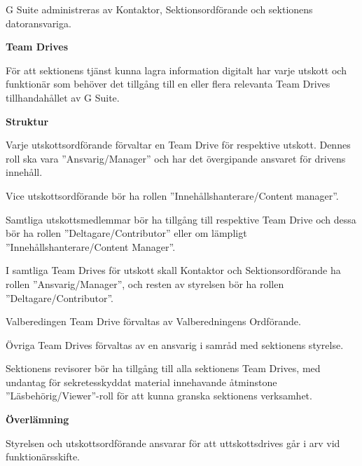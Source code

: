 \documentclass[../_main/handlingar.tex]{subfiles}
\begin{document}
    G Suite administreras av Kontaktor, Sektionsordförande och sektionens datoransvariga. 
    
    \vspace{3px}
    {\large \textbf{Team Drives}}
    \vspace{3px}

    För att sektionens tjänst kunna lagra information digitalt har varje utskott och funktionär som behöver det tillgång till en eller flera relevanta Team Drives tillhandahållet av G Suite. 

    \textbf{Struktur}
    \begin{dashlist}

    \item Varje utskottsordförande förvaltar en Team Drive för respektive utskott. Dennes roll ska vara ''Ansvarig/Manager'' och har det övergipande ansvaret för drivens innehåll. 
    
    \item Vice utskottsordförande bör ha rollen ''Innehållshanterare/Content manager''. 

    \item Samtliga utskottsmedlemmar bör ha tillgång till respektive Team Drive och dessa bör ha rollen ''Deltagare/Contributor'' eller om lämpligt ''Innehållshanterare/Content Manager''. 
    
    \item I samtliga Team Drives för utskott skall Kontaktor och Sektionsordförande ha rollen ''Ansvarig/Manager'', och resten av styrelsen bör ha rollen ''Deltagare/Contributor''.
    
    \item Valberedingen Team Drive förvaltas av Valberedningens Ordförande.
    
    \item Övriga Team Drives förvaltas av en ansvarig i samråd med sektionens styrelse. 

    \item Sektionens revisorer bör ha tillgång till alla sektionens Team Drives, med undantag för sekretesskyddat material innehavande åtminstone ''Läsbehörig/Viewer''-roll för att kunna granska sektionens verksamhet. 
     
    \end{dashlist}
    
    \vspace{3px}
    \textbf{Överlämning}

    Styrelsen och utskottsordförande ansvarar för att uttskottsdrives går i arv vid funktionärsskifte.
\end{document}
